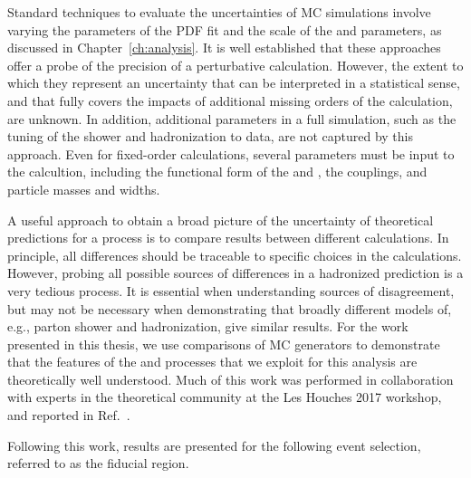 Standard techniques to evaluate the uncertainties of MC simulations involve
varying the parameters of the PDF fit and the scale of the {\muF} and {\muR} parameters,
as discussed in Chapter~\ref{ch:analysis}. 
It is well established that these approaches offer a probe of the precision
of a perturbative calculation. However, the extent to which they represent
an uncertainty that can be interpreted in a statistical sense, and that fully
covers the impacts of additional missing orders of the calculation, are unknown.
In addition, additional parameters in a full simulation, such as the tuning
of the shower and hadronization to data, are not captured by this approach.
Even for fixed-order calculations, several parameters must be input to the calcultion,
including the functional form of the {\muF} and \muR, the couplings, and particle masses and
widths. 

A useful approach to obtain a broad picture of the uncertainty of theoretical
predictions for a process is to compare results between different calculations.
In principle, all differences should be traceable to specific choices in the calculations.
However, probing all possible sources of differences in a hadronized prediction is a very
tedious process. It is essential when understanding sources of disagreement, but
may not be necessary when demonstrating that broadly different models of, e.g., parton
shower and hadronization, give similar results.
For the work presented in this thesis, we use comparisons of MC generators to demonstrate that the 
features of the \EWWZ and \QCDWZ processes that we exploit for this analysis 
are theoretically well understood.
Much of this work was performed
in collaboration with experts in the theoretical community at the Les Houches 2017
workshop, and reported in Ref.~\cite{leshouches2017}.

Following this work, results are presented for the following event selection,
referred to as the fiducial region.

